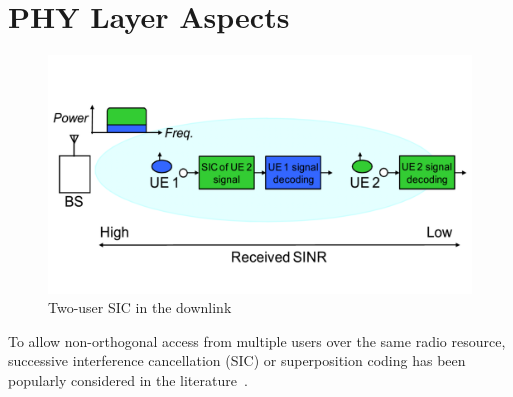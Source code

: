 \section{PHY Layer Aspects}
\label{sec_phy}


\begin{figure}[t]
\begin{center}
\includegraphics[width=1.0\columnwidth ,angle=0]{figure/NOMA_shannon}
\caption{Two-user SIC in the downlink}
\label{fig_NOMA_shannon}
\end{center}
\end{figure}
%


To allow non-orthogonal access from multiple users over the same radio resource, successive interference cancellation (SIC) 
or superposition coding has been popularly considered in the literature~\cite{cite_docomo1,cite_docomo2,cite_docomo3}.


